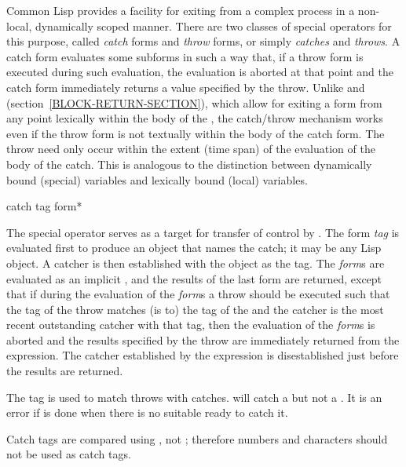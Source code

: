 Common Lisp provides a facility for exiting from a complex process
in a non-local, dynamically scoped manner.  There are two classes of
special operators for this purpose, called \emph{catch} forms and \emph{throw}
forms, or simply \emph{catches} and \emph{throws}.  A catch form evaluates some
subforms in such a way that, if a throw form is executed during such
evaluation, the evaluation is aborted at that point and the catch form
immediately returns a value specified by the throw.  Unlike 
and  (section~\ref{BLOCK-RETURN-SECTION}),
which allow for exiting a  form from any
point lexically within the body of the , the catch/throw
mechanism works even if the throw form is not textually within the body
of the catch form.  The throw need only occur within the extent (time
span) of the evaluation of the body of the catch.  This is analogous to
the distinction between dynamically bound (special) variables and
lexically bound (local) variables.

\begin{defspec}
catch tag {form}*

The  special operator serves as a target for transfer
of control by .
The form \emph{tag} is evaluated first to produce an object
that names the catch; it may be any Lisp object.
A catcher is then established with the object as the tag.
The \emph{form\/}s are evaluated as an implicit ,
and the results of the last form are returned,
except that if during the evaluation of the \emph{form\/}s
a throw should be executed such that the tag
of the throw matches (is  to) the tag of the 
and the catcher is the most recent outstanding catcher with that tag,
then the evaluation of the \emph{form\/}s is aborted and the results
specified by the throw
are immediately returned from the  expression.
The catcher established by the  expression is disestablished
just before the results are returned.

The tag is used to match throws with catches.
 will catch a  but
not a .  It is an error if  is done
when there is no suitable  ready to catch it.

Catch tags are compared using ,
not ; therefore numbers and characters
should not be used as catch tags.
\end{defspec}

